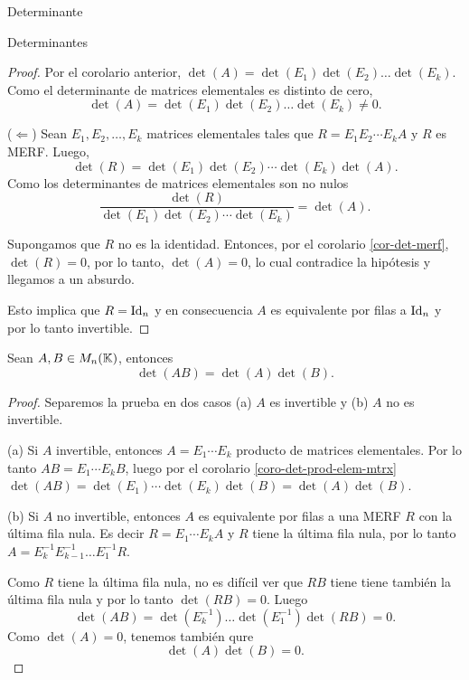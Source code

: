 \begin{chapter}{Determinante}
\begin{section}{Determinantes}
\begin{proof}
                Por el corolario anterior,  $\det(A) = \det(E_1) \det(E_2) \ldots \det(E_k)$. Como el determinante de matrices elementales es distinto de cero, $$\det(A) = \det(E_1) \det(E_2) \ldots \det(E_k)\ne 0.$$
        
                ($\Leftarrow$) Sean $E_1, E_2, \ldots, E_k$ matrices elementales tales que $R = E_1 E_2 \cdots E_k A$ y $R$ es MERF. Luego,
                \begin{equation*}
                    \det(R) = \det(E_1) \det(E_2) \cdots \det(E_k) \det(A). 
                \end{equation*}
                Como los determinantes de matrices  elementales son no nulos
        \begin{equation*}
            \frac{\det(R)}{\det(E_1) \det(E_2) \cdots \det(E_k) } = \det(A). \tag{*}
        \end{equation*}
    
        
        Supongamos que $R$ no es la identidad.  Entonces, por el corolario \ref{cor-det-merf}, $\det(R) =0$,  por lo tanto, $\det(A)=0$, lo cual contradice la hipótesis y llegamos a un absurdo. 
    
        Esto implica que  $R= \operatorname{Id}_n$ y en consecuencia  $A$ es equivalente por filas a $\operatorname{Id}_n$ y por lo tanto  invertible.
            \end{proof}
             
        
             \begin{teorema}\label{th-dem-detAB}  Sean $A,B \in M_n(\mathbb K)$,  entonces
            $$\det (A B) = \det(A)\det(B).$$
             \end{teorema}
             \begin{proof} 	Separemos la prueba en dos casos (a) $A$ es invertible  y (b) $A$ no es invertible.
    
                (a) Si $A$ invertible, entonces $A= E_1\cdots E_k$ producto de matrices elementales. Por lo tanto  $AB =  E_1\cdots E_kB$, luego por el corolario \ref{coro-det-prod-elem-mtrx}  $\det(AB) =  \det(E_1)\cdots \det(E_k)\det(B) = \det(A)\det(B)$. 
                
                (b) Si $A$ no invertible,  entonces $A$  es equivalente por filas a una MERF $R$ con la última fila nula. Es decir $R =E_1\cdots E_kA$ y $R$ tiene la última fila nula, por  lo tanto $A=  E_k^{-1}E_{k-1}^{-1}\ldots E_1^{-1}R$. 
                
                Como $R$ tiene la última fila nula, no es difícil ver que  $RB$ tiene tiene también la última fila nula y por lo tanto $\det(RB)=0$. Luego 
                 $$
                 \det(AB) = \det( E_k^{-1}) \ldots \det(E_1^{-1})\det(RB) =0.
                 $$
                 Como  $\det(A)=0$, tenemos también qure 
                 $$
                 \det(A)\det(B) =0.
                 $$  
             \end{proof}
             

\end{section}
\end{chapter}
